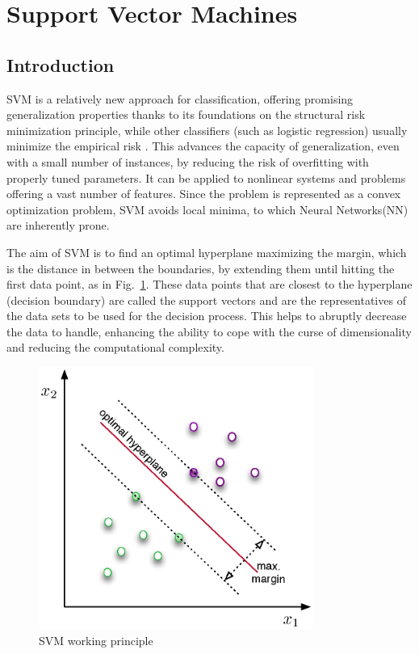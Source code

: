 \section{Support Vector Machines}

\subsection{Introduction}

SVM is a relatively new approach for classification, offering promising generalization properties thanks to its foundations on the structural risk minimization principle, while other classifiers (such as logistic regression) usually minimize the empirical risk \cite{gunn1998support,yin2014study}. 
This advances the capacity of generalization, even with a small number of instances, by reducing the risk of overfitting with properly tuned parameters. 
It can be applied to nonlinear systems and problems offering a vast number of features. 
Since the problem is represented as a convex optimization problem, SVM avoids local minima, to which Neural Networks(NN) are inherently prone.

The aim of SVM is to find an optimal hyperplane maximizing the margin, which is the distance in between the boundaries, by extending them until hitting the first data point, as in Fig.~\ref{fig:svmHyperplane}. These data points that are closest to the hyperplane (decision boundary) are called the support vectors and are the representatives of the data sets to be used for the decision process. This helps to abruptly decrease the data to handle, enhancing the ability to cope with the curse of dimensionality and reducing the computational complexity.

\begin{figure}
\begin{center}
\includegraphics[width=9cm]{figures/svmHyperplane}    %
\caption{SVM working principle} 
\label{fig:svmHyperplane}
\end{center}
\end{figure}

